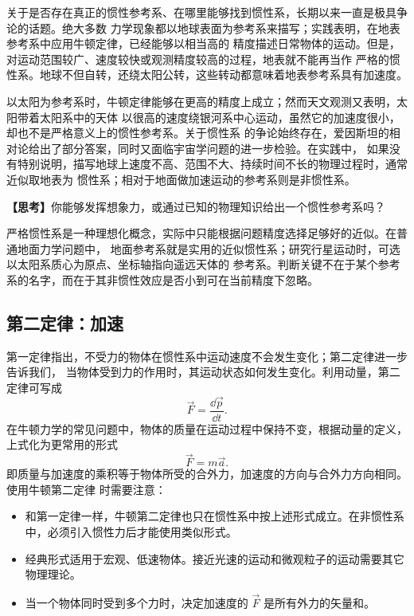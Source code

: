 {关于是否存在真正的惯性参考系、在哪里能够找到惯性系，长期以来一直是极具争论的话题。绝大多数
力学现象都以地球表面为参考系来描写；实践表明，在地表参考系中应用牛顿定律，已经能够以相当高的
精度描述日常物体的运动。但是，对运动范围较广、速度较快或观测精度较高的过程，地表就不能再当作
严格的惯性系。地球不但自转，还绕太阳公转，这些转动都意味着地表参考系具有加速度。

以太阳为参考系时，牛顿定律能够在更高的精度上成立；然而天文观测又表明，太阳带着太阳系中的天体
以很高的速度绕银河系中心运动，虽然它的加速度很小，却也不是严格意义上的惯性参考系。关于惯性系
的争论始终存在，爱因斯坦的相对论给出了部分答案，同时又面临宇宙学问题的进一步检验。在实践中，
如果没有特别说明，描写地球上速度不高、范围不大、持续时间不长的物理过程时，通常近似取地表为
惯性系；相对于地面做加速运动的参考系则是非惯性系。

\noindent\textbf{【思考】}你能够发挥想象力，或通过已知的物理知识给出一个惯性参考系吗？

\begin{thinkanswer}
严格惯性系是一种理想化概念，实际中只能根据问题精度选择足够好的近似。在普通地面力学问题中，
地面参考系就是实用的近似惯性系；研究行星运动时，可选以太阳系质心为原点、坐标轴指向遥远天体的
参考系。判断关键不在于某个参考系的名字，而在于其非惯性效应是否小到可在当前精度下忽略。
\end{thinkanswer}

\subsection{第二定律：加速}

第一定律指出，不受力的物体在惯性系中运动速度不会发生变化；第二定律进一步告诉我们，
当物体受到力的作用时，其运动状态如何发生变化。利用动量，第二定律可写成
\begin{equation}
  \vec F=\frac{\dd\vec p}{\dd t}.
\end{equation}
在牛顿力学的常见问题中，物体的质量在运动过程中保持不变，根据动量的定义，上式化为更常用的形式
\begin{equation}
  \vec F=m\vec a.
\end{equation}
即质量与加速度的乘积等于物体所受的合外力，加速度的方向与合外力方向相同。使用牛顿第二定律
时需要注意：
\begin{itemize}
  \item 和第一定律一样，牛顿第二定律也只在惯性系中按上述形式成立。在非惯性系中，必须引入惯性力后才能使用类似形式。
  \item 经典形式适用于宏观、低速物体。接近光速的运动和微观粒子的运动需要其它物理理论。
  \item 当一个物体同时受到多个力时，决定加速度的 $\vec F$ 是所有外力的矢量和。
\end{itemize}

}
